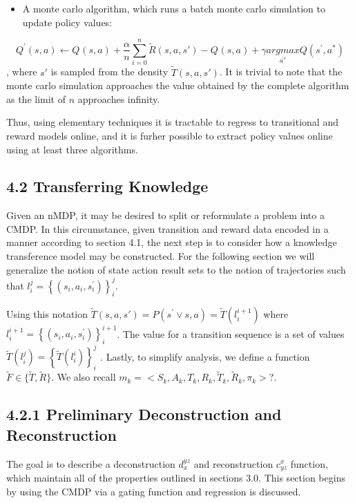 \documentclass{article}
\begin{document}
\begin{itemize}
\item A monte carlo algorithm, which runs a batch monte carlo simulation to update policy values:
\end{itemize}
\begin{equation}
Q^'\left(s,a\right)\leftarrow Q^{}\left(s,a\right)+\frac{\alpha } n\sum _{i=0}^n\widetilde R\left(s,a,s'\right)-Q^{}\left(s,a\right)+\gamma \underset{a^{\ast }}{\mathit{argmax}}Q(s^',a^{\ast })
\end{equation}
, where  $s'$ is sampled from the density  $\widetilde T\left(s,a,s'\right)$. It is trivial to note that the monte carlo simulation approaches the value obtained by the complete algorithm as the limit of  $n$ approaches infinity.

Thus, using elementary techniques it is tractable to regress to transitional and reward models online, and it is furher possible to extract policy values online using at least three algorithms.

\subsection{4.2 Transferring Knowledge}
Given an nMDP, it may be desired to split or reformulate a problem into a CMDP. In this circumstance, given transition and reward data encoded in a manner according to section 4.1, the next step is to consider how a knowledge transference model may be constructed. For the following section we will generalize the notion of state action result sets to the notion of trajectories such that  $l_i^j=\left\{(s_i,a_i,s_i^')\right\}_i^j$.

Using this notation  $\widetilde T\left(s,a,s'\right)=P\left(s^'\vee s,a\right)=\widetilde T\left(l_i^{i+1}\right)$ where  $l_i^{i+1}=\left\{(s_i,a_i,s_i^')\right\}_i^{i+1}$. The value for a transition sequence is a set of values  $\widetilde T\left(l_i^j\right)=\left\{\widetilde T\left(l_i^i\right)\right\}_i^j$ . Lastly, to simplify analysis, we define a function  $\widetilde F{\in}\{\widetilde T,\widetilde R\}$. We also recall  $m_k=<S_k,A_k,T_k,R_k,\widetilde T_k,\widetilde R_k,\pi _k>?$.

\subsection{4.2.1 Preliminary Deconstruction and Reconstruction }

\bigskip

The goal is to describe a deconstruction  $d_x^{\mathit{yz}}$ and reconstruction  $c_{\mathit{yz}}^x$ function, which maintain all of the properties outlined in sections 3.0. This section begins by using the CMDP via a gating function and regression is discussed.
\end{document}
